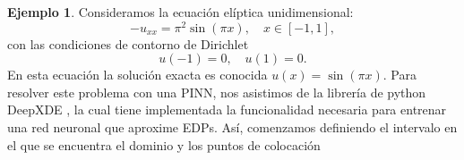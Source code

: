 \documentclass[a4paper,11pt,spanish, twoside, leqno]{tfg-uam}
\theoremstyle{definition}
\newtheorem{exmp}[teor]{Ejemplo}
\begin{document}
\begin{mdframed}
    \begin{exmp}
        Consideramos la ecuación elíptica unidimensional:
        \begin{equation*}
        -u_{xx} = \pi^2 \sin(\pi x), \quad x \in [-1, 1],
        \end{equation*}
        con las condiciones de contorno de Dirichlet
        \begin{equation*}
        u(-1) = 0, \quad u(1) = 0.
        \end{equation*}
        En esta ecuación la solución exacta es  conocida $ u(x) = \sin(\pi x)$. Para resolver este problema con una PINN, nos asistimos de la librería de python DeepXDE \cite{lu2021deepxde}, la cual tiene implementada la funcionalidad necesaria para entrenar una red neuronal que aproxime EDPs. Así, comenzamos definiendo el intervalo en el que se encuentra el dominio y los puntos de colocación
        

\end{exmp}
\end{mdframed}
\end{document}
